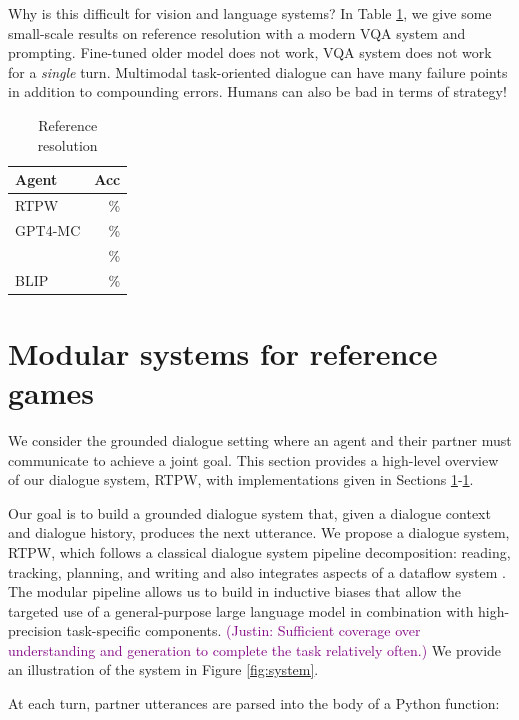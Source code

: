 \documentclass[11pt]{article}
\newcommand{\system}{RTPW}
\newcommand{\justin}[1]{{{\textcolor{purple}{(Justin: #1)}}}}
\begin{document}
Why is this difficult for vision and language systems?
In Table \ref{tbl:refres}, we give some small-scale results on reference resolution with a modern VQA system
and prompting.
Fine-tuned older model does not work, VQA system does not work for a \textit{single} turn.
Multimodal task-oriented dialogue can have many failure points in addition to compounding errors.
Humans can also be bad in terms of strategy!

\begin{table}[!t]
\centering
\begin{tabular}{lr}
\toprule
Agent                   & Acc\\
\midrule
\system{}               & \%  \\
GPT4-MC                 & \%  \\
\citet{fried}           & \%  \\
BLIP                    & \%  \\
\bottomrule
\end{tabular}
\caption{\label{tbl:refres}
Reference resolution
}
\end{table}

\section{Modular systems for reference games}
We consider the grounded dialogue setting where an agent and their partner
must communicate to achieve a joint goal.
This section provides a high-level overview of our dialogue system, \system{},
with implementations given in Sections \ref{}-\ref{}.

Our goal is to build a grounded dialogue system that,
given a dialogue context and dialogue history,
produces the next utterance.
We propose a dialogue system, \system{},
which follows a classical dialogue system pipeline decomposition:
reading, tracking, planning, and writing \citep{young2006pomdp,young2013pomdpsurvey,he2018dnd}
and also integrates aspects of a dataflow system \citep{sm}.
The modular pipeline allows us to build in inductive biases that allow the targeted use of
a general-purpose large language model in combination with high-precision task-specific components.
\justin{Sufficient coverage over understanding and generation to complete the task relatively often.}
We provide an illustration of the system in Figure \ref{fig:system}.

At each turn, partner utterances are parsed into the body of a Python function:
\end{document}
